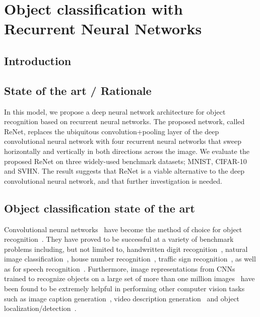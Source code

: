 \chapter{Object classification with Recurrent Neural Networks}\label{sec:renet}

\section{Introduction}\label{sec:renet_intro}



\section{State of the art / Rationale}
In this model, we propose a deep neural network architecture for object
recognition based on recurrent neural networks. The proposed network, called
ReNet, replaces the ubiquitous convolution+pooling layer of the deep
convolutional neural network with four recurrent neural networks that sweep
horizontally and vertically in both directions across the image. We evaluate
the proposed ReNet on three widely-used benchmark datasets; MNIST, CIFAR-10
and SVHN. The result suggests that ReNet is a viable alternative to the deep
convolutional neural network, and that further investigation is needed.

\section{Object classification state of the art}
Convolutional neural networks~\cite[CNN,][]{Fukushima80,LeCun89} have become the
method of choice for object recognition~\citep[see, e.g.,][]{Krizhevsky-2012}.
They have proved to be successful at a variety of benchmark problems including,
but not limited to, handwritten digit recognition~\citep[see,
e.g.,][]{Ciresan-2012}, natural image classification~\citep[see,
e.g.,][]{Lin2014,Simonyan2015,szegedy2014going}, house number
recognition~\citep[see, e.g.,][]{Goodfellow+et+al-ICLR2014a}, traffic sign
recognition~\citep[see, e.g.,][]{Ciresan-et-al-2012}, as well as for speech
recognition~\citep[see, e.g.,][]{Hamid2012, sainath2013, toth2014combining}.
Furthermore, image representations from CNNs trained to recognize objects on a
large set of more than one million images~\citep{Simonyan2015,szegedy2014going}
have been found to be extremely helpful in performing other computer vision
tasks such as image caption generation~\citep[see,
e.g.,][]{Vinyals-et-al-arxiv2014,Xu-et-al-arxiv2015}, video description
generation~\citep[see, e.g.,][]{Li2015} and object
localization/detection~\citep[see, e.g.,][]{Sermanet14}.

